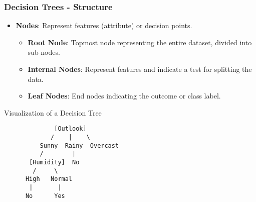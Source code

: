 \documentclass[aspectratio=169]{beamer}
\begin{document}
\begin{frame}[fragile]
    \frametitle{Decision Trees - Structure}
    
    \begin{itemize}
        \item \textbf{Nodes}: Represent features (attribute) or decision points.
            \begin{itemize}
                \item \textbf{Root Node}: Topmost node representing the entire dataset, divided into sub-nodes.
                \item \textbf{Internal Nodes}: Represent features and indicate a test for splitting the data.
                \item \textbf{Leaf Nodes}: End nodes indicating the outcome or class label.
            \end{itemize}
    \end{itemize}

    \begin{block}{Visualization of a Decision Tree}
        \begin{verbatim}
              [Outlook]
             /    |    \
          Sunny  Rainy  Overcast
          /        |        
       [Humidity]  No
        /     \
      High   Normal
       |       |
      No      Yes
        \end{verbatim}
    \end{block}
\end{frame}
\end{document}
